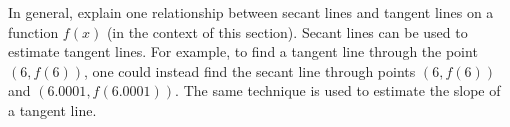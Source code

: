 {In general, explain one relationship between secant lines and tangent lines on a function $f(x)$ (in the context of this section).}
{Secant lines can be used to estimate tangent lines.  For example, to find a tangent line through the point $(6,f(6))$, one could instead find the secant line through points $(6,f(6))$ and $(6.0001,f(6.0001))$.  The same technique is used to estimate the slope of a tangent line.}
